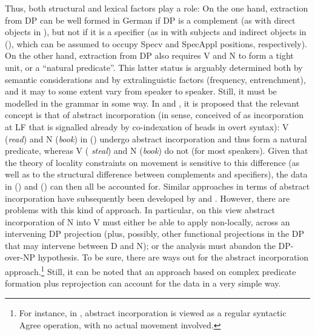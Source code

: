 \documentclass[output=paper
,modfonts
,nonflat]{langsci/langscibook}
\begin{document}
\ea\label{ex:mueller:38}
\z
\z
Thus, both structural and lexical factors play a role: On the one
hand, extraction from DP can be well formed in German if DP is a complement
(as with direct objects in \Last[ab]), but not if it is a specifier (as in
with subjects and indirect objects in (\LLast[a--b]), which can be assumed
to occupy Specv and SpecAppl positions, respectively). On the other
hand, extraction from DP also requires V and N to form a tight unit,
or a ``natural predicate''. This latter status is arguably determined
both by semantic considerations and by extralinguistic factors
(frequency, entrenchment), and it may to some extent vary from speaker
to speaker. Still, it must be modelled in the grammar in some way. In
\cite{Mueller:91:abs} and \cite{Mueller&Sternefeld:95}, it is proposed
that the relevant concept is that of abstract incorporation (in
 sense, conceived of as incorporation at LF that
is signalled already by co-indexation of heads in overt syntax): V
({\itshape read}) and N ({\itshape book}) in (\Last[a]) undergo abstract
incorporation and thus form a natural predicate, whereas V ({\it
  steal}) and N ({\itshape book}) do not (for most speakers). Given that
the theory of locality constraints on movement is sensitive to this
difference (as well as to the structural difference between
complements and specifiers), the data in (\LLast) and (\Last) can then all
be accounted for. Similar approaches in terms of abstract
incorporation have subsequently been developed by
\cite{Davies&Dubinsky:03} and \cite{Schmellentin:06}. However, there
are problems with this kind of approach. In particular, on this view
abstract incorporation of N into V must either be able to apply
non-locally, across an intervening DP projection (plus, possibly,
other functional projections in the DP that may intervene between D
and N); or the analysis must abandon the DP-over-NP hypothesis. To be
sure, there are ways out for the abstract incorporation
approach.\footnote{For instance, in \cite{Mueller:11:loc}, abstract incorporation is
  viewed as a regular syntactic Agree operation, with no actual
  movement involved.} Still, it can be noted that an approach based on
complex predicate formation plus reprojection can account for the data
in a very simple way. 
\end{document}
